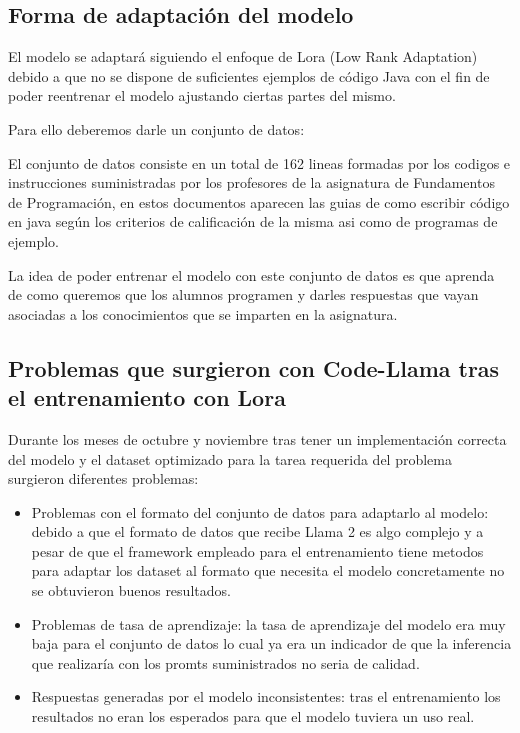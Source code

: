 \subsection{Forma de adaptación del modelo}

El modelo se adaptará siguiendo el enfoque de Lora (Low Rank Adaptation) debido a que no se dispone de suficientes ejemplos de código Java con el fin de poder reentrenar el modelo ajustando ciertas partes del mismo.

Para ello deberemos darle un conjunto de datos:

El conjunto de datos consiste en un total de 162 lineas formadas por los codigos  e instrucciones suministradas por los profesores de la asignatura de Fundamentos de Programación, en estos documentos aparecen las guias de como escribir código en java según los criterios de calificación de la misma asi como de programas de ejemplo.

La idea de poder entrenar el modelo con este conjunto de datos es que aprenda de como queremos que los alumnos programen y darles respuestas que vayan asociadas a los conocimientos que se imparten en la asignatura.

\subsection{Problemas que surgieron con Code-Llama tras el entrenamiento con Lora}

Durante los meses de octubre y noviembre tras tener un implementación correcta del modelo y el dataset optimizado para la tarea requerida del problema surgieron diferentes problemas:

\begin{itemize}
    \item Problemas con el formato del conjunto de datos para adaptarlo al modelo: debido a que el formato de datos que recibe Llama 2 es algo complejo y  a pesar de que el framework empleado para el entrenamiento tiene metodos para adaptar los dataset al formato que necesita el modelo concretamente no se obtuvieron buenos resultados.\cite{formatoLlama2}

    \item Problemas de tasa de aprendizaje: la tasa de aprendizaje del modelo era muy baja para el conjunto de datos lo cual ya era un indicador de que la inferencia que realizaría con los promts suministrados no seria de calidad.

    \item Respuestas generadas por el modelo inconsistentes: tras el entrenamiento los resultados no eran los esperados para que el modelo tuviera un uso real.
\end{itemize}

